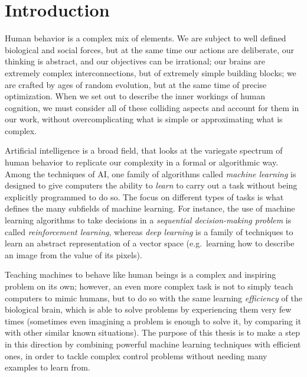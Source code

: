 \chapter{Introduction}
\label{ch1_intro}
\thispagestyle{empty}

\vspace{0.5cm}
 
Human behavior is a complex mix of elements. We are subject to 
well defined biological and social forces, but at the same time our actions are 
deliberate, our thinking is abstract, and our objectives can be irrational; 
our brains are extremely complex interconnections, but of extremely simple 
building blocks; we are crafted by ages of random evolution, but at the same 
time of precise optimization. 
When we set out to describe the inner workings of human cognition, we must 
consider all of these colliding aspects and account for them in our work, 
without overcomplicating what is simple or approximating what is complex.

Artificial intelligence is a broad field, that looks at the variegate spectrum 
of human behavior to replicate our complexity in a formal or algorithmic way. 
Among the techniques of AI, one family of algorithms called \textit{machine
learning} is designed to give computers the ability to \textit{learn} to carry 
out a task without being explicitly programmed to do so. 
The focus on different types of tasks is what defines the many subfields of 
machine learning.
For instance, the use of machine learning algorithms to take decisions in a 
\textit{sequential decision-making problem} is called \textit{reinforcement 
learning}, whereas \textit{deep learning} is a family of techniques to learn an 
abstract representation of a vector space (e.g.\ learning how to describe an
image from the value of its pixels).

Teaching machines to behave like human beings is a complex and inspiring problem
on its own; however, an even more complex task is not to simply teach 
computers to mimic humans, but to do so with the same learning 
\textit{efficiency} of the biological brain, which is able to solve problems by
experiencing them very few times (sometimes even imagining a problem is enough 
to solve it, by comparing it with other similar known situations). 
The purpose of this thesis is to make a step in this direction by
combining powerful machine learning techniques with efficient ones, in order
to tackle complex control problems without needing many examples to learn
from.

